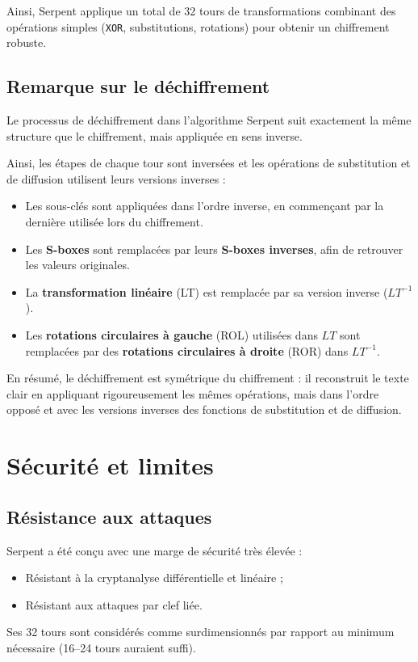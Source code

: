 \documentclass[12pt,a4paper]{report}
\begin{document}
Ainsi, Serpent applique un total de 32 tours de transformations combinant 
des opérations simples (\texttt{XOR}, substitutions, rotations) pour obtenir un chiffrement robuste.

\subsection{Remarque sur le déchiffrement}

Le processus de déchiffrement dans l’algorithme Serpent suit exactement la même structure 
que le chiffrement, mais appliquée en sens inverse.  

Ainsi, les étapes de chaque tour sont inversées et les opérations de substitution et de 
diffusion utilisent leurs versions inverses :  

\begin{itemize}
    \item Les sous-clés sont appliquées dans l’ordre inverse, en commençant par la dernière 
    utilisée lors du chiffrement.
    \item Les \textbf{S-boxes} sont remplacées par leurs \textbf{S-boxes inverses}, afin de retrouver les valeurs originales.
    \item La \textbf{transformation linéaire} (LT) est remplacée par sa version inverse (\(LT^{-1}\)).
    \item Les \textbf{rotations circulaires à gauche} (ROL) utilisées dans \(LT\) sont remplacées 
    par des \textbf{rotations circulaires à droite} (ROR) dans \(LT^{-1}\).
\end{itemize}

En résumé, le déchiffrement est symétrique du chiffrement : il reconstruit le texte clair en 
appliquant rigoureusement les mêmes opérations, mais dans l’ordre opposé et avec les versions inverses 
des fonctions de substitution et de diffusion.






\section*{Sécurité et limites}

\setcounter{subsection}{0}

\subsection{Résistance aux attaques}
Serpent a été conçu avec une marge de sécurité très élevée :
\begin{itemize}
    \item Résistant à la cryptanalyse différentielle et linéaire ;
    \item Résistant aux attaques par clef liée.
\end{itemize}
Ses 32 tours sont considérés comme surdimensionnés par rapport au minimum nécessaire (16–24 tours auraient suffi).
\end{document}
